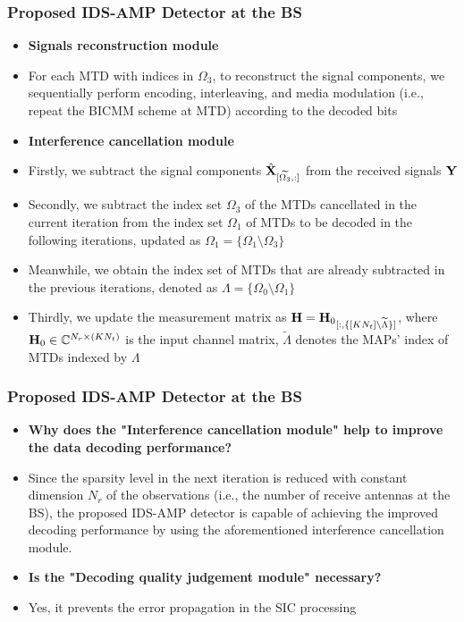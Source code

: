 \documentclass[9pt]{beamer}
\begin{document}
\begin{frame}
\frametitle{Proposed IDS-AMP Detector at the BS}
\begin{itemize}
\item
{\bf Signals reconstruction module}
\item
For each MTD with indices in $\Omega_3$, to reconstruct the signal components, we sequentially perform encoding, interleaving, and media modulation (i.e., repeat the BICMM scheme at MTD) according to the decoded bits
\item
{\bf Interference cancellation module}
\item
Firstly, we subtract the signal components $\hat{\bf X}_{[\widetilde{\Omega_3},:]}$ from the received signals ${\bf Y}$
\item
Secondly, we subtract the index set $\Omega_3$ of the MTDs cancellated in the current iteration from the index set $\Omega_1$ of MTDs to be decoded in the following iterations, updated as $\Omega_1=\{\Omega_1\setminus \Omega_3\}$
\item
Meanwhile, we obtain the index set of MTDs that are already subtracted in the previous iterations, denoted as $\Lambda=\{\Omega_0\setminus \Omega_1\}$
\item
Thirdly, we update the measurement matrix as ${\bf H}={{\bf H}_0}_{[:,\{[KN_t]\setminus\widetilde{\Lambda}\}]}$, where ${\bf H}_0\in\mathbb{C}^{N_r \times (K N_t)}$ is the input channel matrix, $\widetilde{\Lambda}$ denotes the MAPs' index of MTDs indexed by $\Lambda$
\end{itemize}
\end{frame}

\begin{frame}
\frametitle{Proposed IDS-AMP Detector at the BS}
\begin{itemize}
\item
{\bf Why does the "Interference cancellation module" help to improve the data decoding performance?}
\item
Since the sparsity level in the next iteration is reduced with constant dimension $N_r$ of the observations (i.e., the number of receive antennas at the BS), the proposed IDS-AMP detector is capable of achieving the improved decoding performance by using the aforementioned interference cancellation module.

\item
{\bf Is the "Decoding quality judgement module" necessary?}
\item
Yes, it prevents the error propagation in the SIC processing
\end{itemize}
\end{frame}
\end{document}
